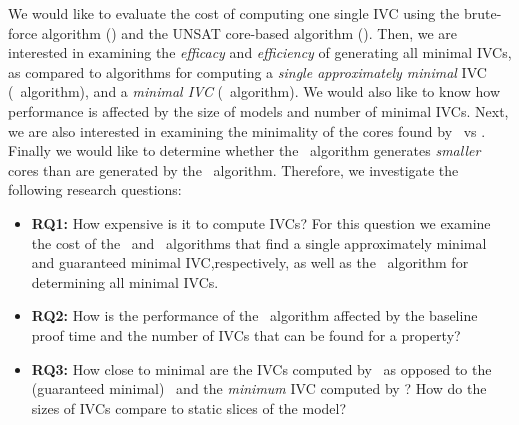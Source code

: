 We would like to evaluate the cost of computing one single IVC using the brute-force
algorithm (\ucbfalg) and the UNSAT core-based algorithm (\ucalg).
Then, we are interested in examining the {\em efficacy} and {\em efficiency} of generating all minimal IVCs, as compared to algorithms for computing a {\em single approximately minimal} IVC (\ucalg\ algorithm), and a {\em minimal IVC} (\ucbfalg\ algorithm).  We would also like to know how performance is affected by the size of models and number of minimal IVCs.  Next, we are also interested in examining the minimality of the cores found by \ucbfalg\ vs  \ucalg . Finally we would like to determine whether the \aivcalg\ algorithm generates {\em smaller} cores than are generated by the \ucbfalg\ algorithm.  %
%
%
Therefore, we investigate the following research questions:
\begin{itemize}
  \item \textbf{RQ1:} How expensive is it to compute IVCs?  For this question we examine the cost of the \ucalg ~and \ucbfalg ~algorithms that find a single approximately minimal and guaranteed minimal IVC,respectively, as well as the \aivcalg ~algorithm for determining all minimal IVCs.
  \item \textbf{RQ2:} How is the performance of the \aivcalg ~algorithm affected by the baseline proof time and the number of IVCs that can be found for a property?
   \item \textbf{RQ3:} How close to minimal are the IVCs computed by \ucalg\ as opposed to the (guaranteed minimal) \ucbfalg\ and the \emph{minimum} IVC computed by \aivcalg ?  How do the sizes of IVCs compare to static slices of the model?
%
\end{itemize}


